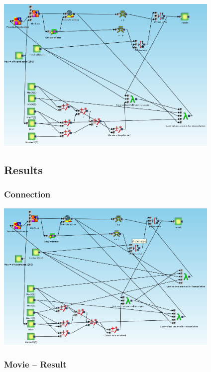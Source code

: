 \documentclass{beamer}
\begin{document}
\begin{frame}
	\frametitle{}
	\includegraphics[width=10.8cm]{exampleWithoutInterpolationOnMax}
\end{frame}

\subsection{Results}
\begin{frame}
	\frametitle{Connection}
	\includegraphics[width=10.8cm]{exampleResult}
\end{frame}

\begin{frame}
	\frametitle{Movie -- Result}
\end{frame}
\end{document}
